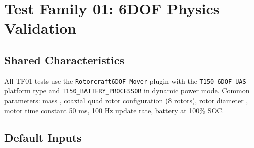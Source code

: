 \section{\unclass Test Family 01: 6DOF Physics Validation}\label{sec:TF01}

\subsection{\unclass Shared Characteristics}\label{sec:TF01Shared}

\unclass All TF01 tests use the \texttt{Rotorcraft6DOF\_Mover} plugin with the \texttt{T150\_6DOF\_UAS} platform type and \texttt{T150\_BATTERY\_PROCESSOR} in dynamic power mode. Common parameters: mass \mtow{}, coaxial quad rotor configuration (8 rotors), rotor diameter \propDiameter{}, motor time constant 50 ms, 100 Hz update rate, battery \batteryCapacity{} at 100\% SOC.

\subsection{\unclass Default Inputs}\label{sec:TF01DefaultInputs}

